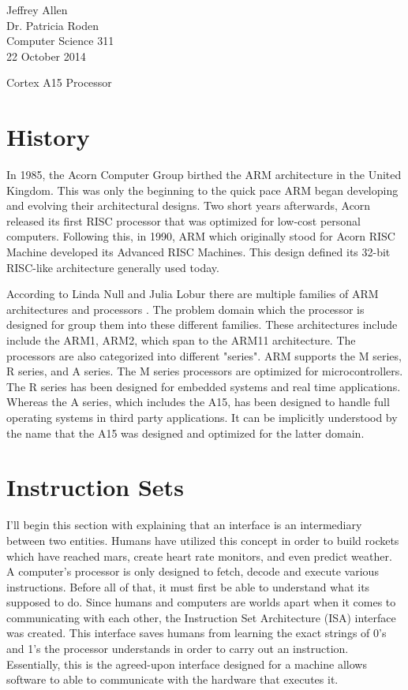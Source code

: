 \documentclass[12pt]{scrreprt}
\begin{document}
\tableofcontents

\pagebreak
\begin{flushleft}
Jeffrey Allen\\
Dr. Patricia Roden\\
Computer Science 311\\
22 October 2014
\end{flushleft}

\centerline{Cortex A15 Processor}

{\let\clearpage\relax\chapter{History}}

In 1985, the Acorn Computer Group birthed the ARM architecture in the United Kingdom. This was only the beginning to the quick pace ARM began developing and evolving their architectural designs. Two short years afterwards, Acorn released its first RISC processor that was optimized for low-cost personal computers. Following this, in 1990, ARM which originally stood for Acorn RISC Machine developed its Advanced RISC Machines. This design defined its 32-bit RISC-like architecture generally used today.

	According to Linda Null and Julia Lobur there are multiple families of ARM architectures and processors \autocite[327]{classtext}.
	The problem domain which the processor is designed for group them into these different families. 
	These architectures include include the ARM1, ARM2, which span to the ARM11 architecture.
	The processors are also categorized into different "series".
	ARM supports the M series, R series, and A series.
	The M series processors are optimized for microcontrollers. 
	The R series has been designed for embedded systems and real time applications.
	Whereas the A series, which includes the A15, has been designed to handle full operating systems in third party applications. 
	It can be implicitly understood by the name that the A15 was designed and optimized for the latter domain.

{\let\clearpage\relax\chapter{Instruction Sets}}

		I'll begin this section with explaining that an interface is an intermediary between two entities.
	Humans have utilized this concept in order to build rockets which have reached mars, create heart rate monitors, and even predict weather. 
	A computer's processor is only designed to fetch, decode and execute various instructions.
	Before all of that, it must first be able to understand what its supposed to do.
	Since humans and computers are worlds apart when it comes to communicating with each other, the Instruction Set Architecture (ISA) interface was created.
	This interface saves humans from learning the exact strings of 0's and 1's the processor understands in order to carry out an instruction.
	Essentially, this is the agreed-upon interface designed for a machine allows software to able to communicate with the hardware that executes it\autocite[233]{classtext}.
\end{document}
